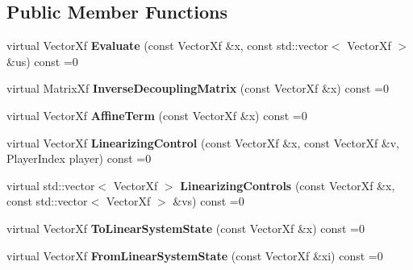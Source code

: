 \subsection*{Public Member Functions}
\begin{DoxyCompactItemize}
\item 
virtual Vector\+Xf {\bfseries Evaluate} (const Vector\+Xf \&x, const std\+::vector$<$ Vector\+Xf $>$ \&us) const =0\hypertarget{classilqgames_1_1_multi_player_flat_system_a5d05a118c1871d8d2493635fe8413652}{}\label{classilqgames_1_1_multi_player_flat_system_a5d05a118c1871d8d2493635fe8413652}

\item 
virtual Matrix\+Xf {\bfseries Inverse\+Decoupling\+Matrix} (const Vector\+Xf \&x) const =0\hypertarget{classilqgames_1_1_multi_player_flat_system_ada6148061596394fad774daa37596065}{}\label{classilqgames_1_1_multi_player_flat_system_ada6148061596394fad774daa37596065}

\item 
virtual Vector\+Xf {\bfseries Affine\+Term} (const Vector\+Xf \&x) const =0\hypertarget{classilqgames_1_1_multi_player_flat_system_a163e065f928dcf06d318c326179cfe77}{}\label{classilqgames_1_1_multi_player_flat_system_a163e065f928dcf06d318c326179cfe77}

\item 
virtual Vector\+Xf {\bfseries Linearizing\+Control} (const Vector\+Xf \&x, const Vector\+Xf \&v, Player\+Index player) const =0\hypertarget{classilqgames_1_1_multi_player_flat_system_a8208bc8f674e9336c9e02af26ab45f45}{}\label{classilqgames_1_1_multi_player_flat_system_a8208bc8f674e9336c9e02af26ab45f45}

\item 
virtual std\+::vector$<$ Vector\+Xf $>$ {\bfseries Linearizing\+Controls} (const Vector\+Xf \&x, const std\+::vector$<$ Vector\+Xf $>$ \&vs) const =0\hypertarget{classilqgames_1_1_multi_player_flat_system_adf25dd35fbef86603f2e5d0dcc733e43}{}\label{classilqgames_1_1_multi_player_flat_system_adf25dd35fbef86603f2e5d0dcc733e43}

\item 
virtual Vector\+Xf {\bfseries To\+Linear\+System\+State} (const Vector\+Xf \&x) const =0\hypertarget{classilqgames_1_1_multi_player_flat_system_a2ace258741dd490be115378fca8fb0d7}{}\label{classilqgames_1_1_multi_player_flat_system_a2ace258741dd490be115378fca8fb0d7}

\item 
virtual Vector\+Xf {\bfseries From\+Linear\+System\+State} (const Vector\+Xf \&xi) const =0\hypertarget{classilqgames_1_1_multi_player_flat_system_a0e93189c620e44698a8a873a6ce2acdc}{}\label{classilqgames_1_1_multi_player_flat_system_a0e93189c620e44698a8a873a6ce2acdc}


\end{DoxyCompactItemize}
